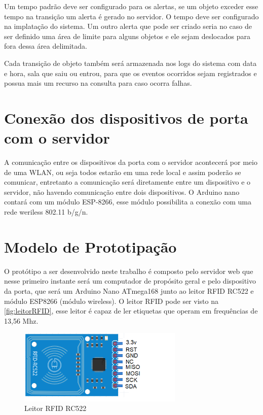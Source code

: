 \par
Um tempo padrão deve ser configurado para os alertas, se um objeto exceder esse tempo na transição um alerta é gerado no servidor. 
O tempo deve ser configurado na implatação do sistema. Um outro alerta que pode ser criado seria no caso de ser definido uma área de limite para alguns objetos e ele sejam deslocados para fora dessa área delimitada.
\par
Cada transição de objeto também será armazenada nos logs do sistema com data e hora, sala que saiu ou entrou, para que os eventos ocorridos sejam registrados e possua mais um recurso na consulta para caso ocorra falhas.


\section{Conexão dos dispositivos de porta com o servidor}
A comunicação entre os dispositivos da porta com o servidor acontecerá por meio de uma WLAN, ou seja todos estarão em uma rede 
local e assim poderão se comunicar, entretanto a comunicação será diretamente entre um dispositivo e o servidor, 
não havendo comunicação entre dois dispositivos. O Arduino nano contará com um módulo ESP-8266, esse módulo possibilita a 
conexão com uma rede weriless 802.11 b/g/n.


\section{Modelo de Prototipação}

O protótipo a ser desenvolvido neste trabalho é composto pelo servidor web que nesse primeiro instante será um computador de 
propósito geral e pelo dispositivo da porta, que será um Arduino Nano ATmega168 junto ao leitor RFID RC522 e módulo ESP8266 (módulo wireless). 
O leitor RFID pode ser visto na \autoref{fig:leitorRFID}, esse leitor é capaz de ler etiquetas que operam em 
frequências de 13,56 Mhz.
\begin{figure}[H]
              \caption{\label{fig:leitorRFID}{Leitor RFID RC522}}
              \centering
              \includegraphics[width=0.7\textwidth]{Figuras/rfid_rc522.PNG}
\end{figure}

